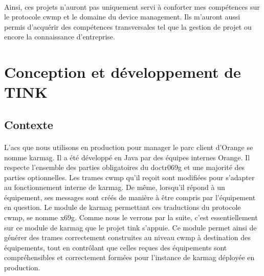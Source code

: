 \documentclass[12pt,a4paper]{report}
\begin{document}
\paragraph*{}Ainsi, ces projets n'auront pas uniquement servi à conforter mes compétences sur le protocole \gls{cwmp} et le domaine du device management. Ils m'auront aussi permis d'acquérir des compétences transversales tel que la gestion de projet ou encore la connaissance d'entreprise.\\


\newpage
\section{Conception et développement de TINK}
\subsection{Contexte}
\paragraph*{}L’\gls{acs} que nous utilisons en production pour manager le parc client d'Orange se nomme \gls{karmag}. Il a été développé en Java par des équipes internes Orange. Il respecte l’ensemble des parties obligatoires du \gls{doctr069g} et une majorité des parties optionnelles. Les trames \gls{cwmp} qu’il reçoit sont modifiées pour s’adapter au fonctionnement interne de \gls{karmag}. De même, lorsqu’il répond à un équipement, ses messages sont créés de manière à être compris par l’équipement en question. Le module de \gls{karmag} permettant ces traductions du protocole \gls{cwmp}, se nomme \gls{x69g}. Comme nous le verrons par la suite, c’est essentiellement sur ce module de \gls{karmag} que le projet \gls{tink} s’appuie. Ce module permet ainsi de générer des trames correctement construites au niveau \gls{cwmp} à destination des équipements, tout en contrôlant que celles reçues des équipements sont compréhensibles et correctement formées pour l’instance de \gls{karmag} déployée en production.
\end{document}
